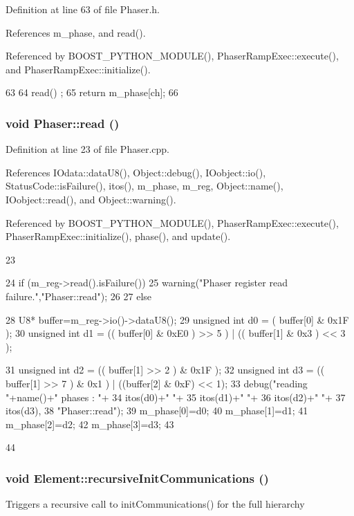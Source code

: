 Definition at line 63 of file Phaser.h.

References m\_\-phase, and read().

Referenced by BOOST\_\-PYTHON\_\-MODULE(), PhaserRampExec::execute(), and PhaserRampExec::initialize().


\begin{DoxyCode}
63                                      {
64     read() ;
65     return m_phase[ch];
66   }
\end{DoxyCode}
\hypertarget{classPhaser_a6ce0713403e961495192ffa0590c29e4}{
\subsubsection[{read}]{\setlength{\rightskip}{0pt plus 5cm}void Phaser::read ()}}
\label{classPhaser_a6ce0713403e961495192ffa0590c29e4}


Definition at line 23 of file Phaser.cpp.

References IOdata::dataU8(), Object::debug(), IOobject::io(), StatusCode::isFailure(), itos(), m\_\-phase, m\_\-reg, Object::name(), IOobject::read(), and Object::warning().

Referenced by BOOST\_\-PYTHON\_\-MODULE(), PhaserRampExec::execute(), PhaserRampExec::initialize(), phase(), and update().


\begin{DoxyCode}
23                   {
24   if (m_reg->read().isFailure()){
25     warning("Phaser register read failure.","Phaser::read");
26   }
27   else {
28     U8* buffer=m_reg->io()->dataU8();
29     unsigned int d0 = (  buffer[0] & 0x1F );
30     unsigned int d1 = (( buffer[0] & 0xE0 ) >> 5 ) | (( buffer[1] & 0x3 ) << 3 );
      
31     unsigned int d2 = (( buffer[1] >> 2 ) & 0x1F );
32     unsigned int d3 = (( buffer[1] >> 7 ) & 0x1 )  | ((buffer[2] & 0xF) << 1);
33     debug("reading "+name()+" phases : "+
34         itos(d0)+" "+
35         itos(d1)+" "+
36         itos(d2)+" "+
37         itos(d3),
38         "Phaser::read");
39     m_phase[0]=d0;
40     m_phase[1]=d1;
41     m_phase[2]=d2;
42     m_phase[3]=d3;
43   }
44 }
\end{DoxyCode}
\hypertarget{classElement_a82119ed37dff76508a2746a853ec35ba}{
\subsubsection[{recursiveInitCommunications}]{\setlength{\rightskip}{0pt plus 5cm}void Element::recursiveInitCommunications ()}}
\label{classElement_a82119ed37dff76508a2746a853ec35ba}
Triggers a recursive call to initCommunications() for the full hierarchy

